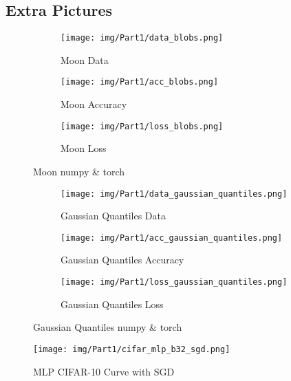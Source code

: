 \begin{appendix}

  \section{Extra Pictures}

  \begin{figure}[!htbp]
    \centering
    \begin{subfigure}[b]{0.85\textwidth}
      \texttt{[image: img/Part1/data\_blobs.png]}
      \caption{Moon Data}
    \end{subfigure}
    \begin{subfigure}[b]{0.90\textwidth}
      \texttt{[image: img/Part1/acc\_blobs.png]}
      \caption{Moon Accuracy}
    \end{subfigure}
    \begin{subfigure}[b]{0.90\textwidth}
      \texttt{[image: img/Part1/loss\_blobs.png]}
      \caption{Moon Loss}
    \end{subfigure}
    \caption{Moon numpy \& torch}
    \label{fig:p1t1_blobs}
  \end{figure}

  \begin{figure}[!htbp]
    \centering
    \begin{subfigure}[b]{0.85\textwidth}
      \texttt{[image: img/Part1/data\_gaussian\_quantiles.png]}
      \caption{Gaussian Quantiles Data}
    \end{subfigure}
    \begin{subfigure}[b]{0.9\textwidth}
      \texttt{[image: img/Part1/acc\_gaussian\_quantiles.png]}
      \caption{Gaussian Quantiles Accuracy}
    \end{subfigure}
    \begin{subfigure}[b]{0.9\textwidth}
      \texttt{[image: img/Part1/loss\_gaussian\_quantiles.png]}
      \caption{Gaussian Quantiles Loss}
    \end{subfigure}
    \caption{Gaussian Quantiles numpy \& torch}
    \label{fig:p1t1_gaussian_quantiles}
  \end{figure}

  \begin{figure}[!htbp]
    \centering
    \texttt{[image: img/Part1/cifar\_mlp\_b32\_sgd.png]}
    \caption{MLP CIFAR-10 Curve with SGD}
    \label{fig:p1t3_cifar_sgd}
  \end{figure}


\end{appendix}
